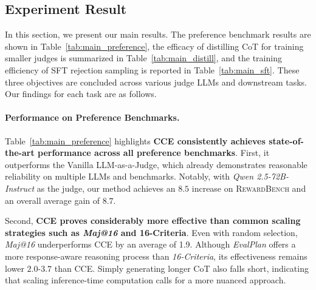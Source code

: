 \subsection{Experiment Result}
In this section, we present our main results. The preference benchmark results are shown in Table~\ref{tab:main_preference}, the efficacy of distilling CoT for training smaller judges is summarized in Table~\ref{tab:main_distill}, and the training efficiency of SFT rejection sampling is reported in Table~\ref{tab:main_sft}. These three objectives are concluded across various judge LLMs and downstream tasks. Our findings for each task are as follows.



\paragraph{Performance on Preference Benchmarks.} Table~\ref{tab:main_preference} highlights \textbf{\textsc{CCE} consistently achieves state-of-the-art performance across all preference benchmarks}. First, it outperforms the Vanilla LLM-as-a-Judge, which already demonstrates reasonable reliability on multiple LLMs and benchmarks. Notably, with \textit{Qwen 2.5-72B-Instruct} as the judge, our method achieves an $8.5$ increase on \textsc{RewardBench} and an overall average gain of $8.7$. 
%



Second, \textbf{\textsc{CCE} proves considerably more effective than common scaling strategies such as \textit{Maj@16} and 16-Criteria}. Even with random selection, \textit{Maj@16} underperforms \textsc{CCE} by an average of 1.9. Although \textit{EvalPlan} offers a more response-aware reasoning process than \textit{16-Criteria}, its effectiveness remains lower $2.0$-$3.7$ than \textsc{CCE}. Simply generating longer CoT also falls short, indicating that scaling inference-time computation calls for a more nuanced approach.




